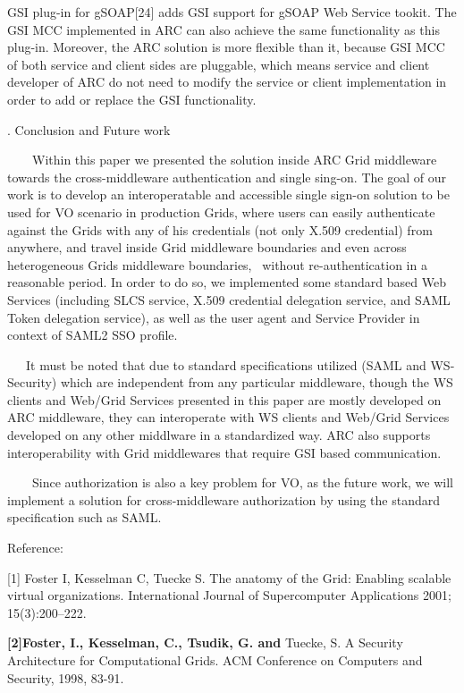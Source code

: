 \documentclass{article}
\newcommand\textstyleStrongEmphasis[1]{\textbf{#1}}
\begin{document}
GSI plug-in for gSOAP[24] adds GSI support for gSOAP Web Service tookit.
The GSI MCC implemented in ARC can also achieve the same functionality
as this plug-in. Moreover, the ARC solution is more flexible than it,
because GSI MCC of both service and client sides are pluggable, which
means service and client developer of ARC do not need to modify the
service or client implementation in order to add or replace the GSI
functionality.


\bigskip

{. Conclusion and Future work
\par}

\ \ \ \ Within this paper we presented the solution inside ARC Grid
middleware towards the cross-middleware authentication and single
sing-on. The goal of our work is to develop an interoperatable and
accessible single sign-on solution to be used for VO scenario in
production Grids, where users can easily authenticate against the Grids
with any of his credentials (not only X.509 credential) from anywhere,
and travel inside Grid middleware boundaries and even across
heterogeneous Grids middleware boundaries, \ without re-authentication
in a reasonable period. In order to do so, we implemented some standard
based Web Services (including SLCS service, X.509 credential delegation
service, and SAML Token delegation service), as well as the user agent
and Service Provider in context of SAML2 SSO profile.

\ \ \ It must be noted that due to standard specifications utilized
(SAML and WS-Security) which are independent from any particular
middleware, though the WS clients and Web/Grid Services presented in
this paper are mostly developed on ARC middleware, they can
interoperate with WS clients and Web/Grid Services developed on any
other middlware in a standardized way. ARC also supports
interoperability with Grid middlewares that require GSI based
communication.

\ \ \ \ Since authorization is also a key problem for VO, as the future
work, we will implement a solution for cross-middleware authorization
by using the standard specification such as SAML.


\bigskip

Reference:

[1] Foster I, Kesselman C, Tuecke S. The anatomy of the Grid: Enabling
scalable virtual organizations. International Journal of Supercomputer
Applications 2001; 15(3):200--222. 

\textstyleStrongEmphasis{\textmd{[2]}}\textstyleStrongEmphasis{\textmd{Foster,
I., Kesselman, C., Tsudik, G. and }}Tuecke, S. A Security Architecture
for Computational Grids. ACM Conference on Computers and Security,
1998, 83-91.
\end{document}
